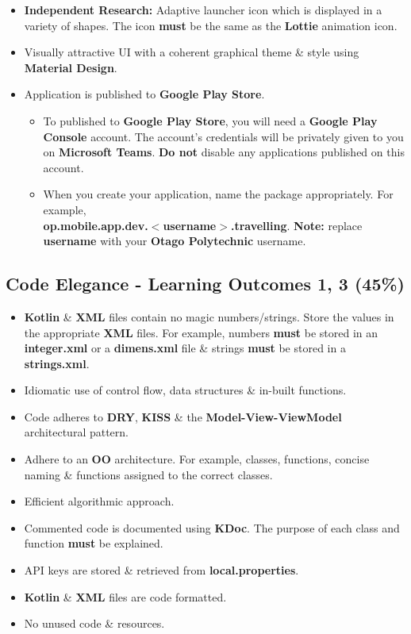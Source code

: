 \documentclass{article}
\begin{document}
\begin{itemize}
	\item \textbf{Independent Research:} Adaptive launcher icon which is displayed in a variety of shapes. The icon \textbf{must} be the same as the \textbf{Lottie} animation icon.
	\item Visually attractive UI with a coherent graphical theme \& style using \textbf{Material Design}.
	\item Application is published to \textbf{Google Play Store}.
	      \begin{itemize}
		      \item To published to \textbf{Google Play Store}, you will need a \textbf{Google Play Console} account. The account's credentials will be privately given to you on \textbf{Microsoft Teams}. \textbf{Do not} disable any applications published on this account.
		      \item When you create your application, name the package appropriately. For example, \\ \textbf{op.mobile.app.dev.$<$username$>$.travelling}. \textbf{Note:} replace \textbf{username} with your \textbf{Otago Polytechnic} username.
	      \end{itemize}
\end{itemize}

\subsection*{Code Elegance - Learning Outcomes 1, 3 (45\%)}
\begin{itemize}
	\item \textbf{Kotlin} \& \textbf{XML} files contain no magic numbers/strings. Store the values in the appropriate \textbf{XML} files. For example, numbers \textbf{must} be stored in an \textbf{integer.xml} or a \textbf{dimens.xml} file \& strings \textbf{must} be stored in a \textbf{strings.xml}.
	\item Idiomatic use of control flow, data structures \& in-built functions.
	\item Code adheres to \textbf{DRY}, \textbf{KISS} \& the \textbf{Model-View-ViewModel} architectural pattern.
	\item Adhere to an \textbf{OO} architecture. For example, classes, functions, concise naming \& functions assigned to the correct classes.
	\item Efficient algorithmic approach.
	\item Commented code is documented using \textbf{KDoc}. The purpose of each class and function \textbf{must} be explained.
	\item API keys are stored \& retrieved from \textbf{local.properties}.
	\item \textbf{Kotlin} \& \textbf{XML} files are code formatted.
	\item No unused code \& resources.
\end{itemize}
\end{document}
